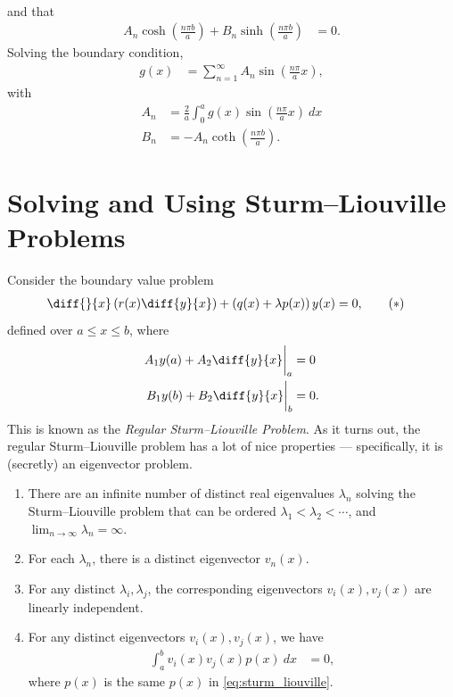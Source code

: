 \documentclass[10pt]{mypackage}
\begin{document}
\begin{example}
\begin{align*}
  \end{align*}
  and that
  \begin{align*}
    A_n\cosh\left( \frac{n\pi b}{a} \right) + B_n\sinh\left( \frac{n\pi b}{a} \right) &= 0.
  \end{align*}
  Solving the boundary condition,
  \begin{align*}
    g(x) &= \sum_{n=1}^{\infty}A_n\sin\left( \frac{n\pi}{a}x \right),
  \end{align*}
  with
  \begin{align*}
    A_n &= \frac{2}{a}\int_{0}^{a} g(x)\sin\left( \frac{n\pi}{a}x \right)\:dx\\
    B_n &= -A_n\coth\left( \frac{n\pi b}{a} \right).
  \end{align*}
\end{example}
\section{Solving and Using Sturm--Liouville Problems}%
Consider the boundary value problem
\begin{align*}
  \diff{}{x}\left( r(x)\diff{y}{x} \right) + \left( q(x) + \lambda p(x) \right)y(x) &= 0,\label{eq:sturm_liouville}\tag{$\ast$}
\end{align*}
defined over $a\leq x \leq b$, where
\begin{align*}
  A_1y(a) + A_2\diff{y}{x}\biggr\vert_{a} &= 0\\
  B_1y(b) + B_2\diff{y}{x}\biggr\vert_{b} &= 0.
\end{align*}
This is known as the \textit{Regular Sturm--Liouville Problem}. As it turns out, the regular Sturm--Liouville problem has a lot of nice properties --- specifically, it is (secretly) an eigenvector problem.
\begin{theorem}\hfill
  \begin{enumerate}[(1)]
    \item There are an infinite number of distinct real eigenvalues $\lambda_n$ solving the Sturm--Liouville problem that can be ordered $\lambda_1 < \lambda_2 < \cdots$, and $\lim_{n\rightarrow\infty}\lambda_n = \infty$.
    \item For each $\lambda_n$, there is a distinct eigenvector $v_n(x)$.
    \item For any distinct $\lambda_i,\lambda_j$, the corresponding eigenvectors $v_i(x),v_j(x)$ are linearly independent.
    \item For any distinct eigenvectors $v_i(x),v_j(x)$, we have
      \begin{align*}
        \int_{a}^{b} v_i(x)v_j(x)p(x)\:dx &= 0,
      \end{align*}
      where $p(x)$ is the same $p(x)$ in \eqref{eq:sturm_liouville}.
  \end{enumerate}
\end{theorem}
\end{document}
